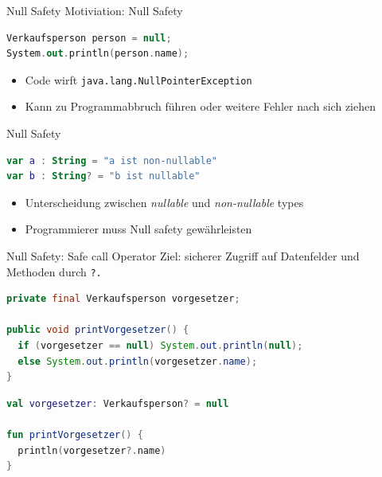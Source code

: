 \documentclass{beamer}
\begin{document}

\begin{frame}[fragile]{Null Safety}
  Motiviation: Null Safety
  \pause\vspace{1cm}
  \begin{lstlisting}[language=Kotlin, title=Java Beispiel, xleftmargin=1em]
Verkaufsperson person = null;
System.out.println(person.name);
  \end{lstlisting}
  \pause\vspace{1cm}
  \begin{itemize}[<+->]
    \item Code wirft \texttt{java.lang.NullPointerException}
    \item Kann zu Programmabbruch führen oder weitere Fehler nach sich ziehen
  \end{itemize}
\end{frame}

\begin{frame}[fragile]{Null Safety}
  \begin{lstlisting}[language=Kotlin]
var a : String = "a ist non-nullable"
var b : String? = "b ist nullable"
  \end{lstlisting}
  \pause \vspace{1cm}
  \begin{itemize}
    \item Unterscheidung zwischen \textit{nullable} und \textit{non-nullable} types
    \item Programmierer muss Null safety gewährleisten
  \end{itemize}
\end{frame}

\begin{frame}[fragile]{Null Safety: Safe call Operator}
  Ziel: sicherer Zugriff auf Datenfelder und Methoden durch \texttt{?.}
  \pause
  \begin{lstlisting}[language=Java, title=in Java]
private final Verkaufsperson vorgesetzer;

public void printVorgesetzer() {
  if (vorgesetzer == null) System.out.println(null);
  else System.out.println(vorgesetzer.name);
}
  \end{lstlisting}
  \pause
  \begin{lstlisting}[language=Kotlin, title=in Kotlin]
val vorgesetzer: Verkaufsperson? = null

fun printVorgesetzer() {
  println(vorgesetzer?.name)
} 
  \end{lstlisting}
\end{frame}
\end{document}
